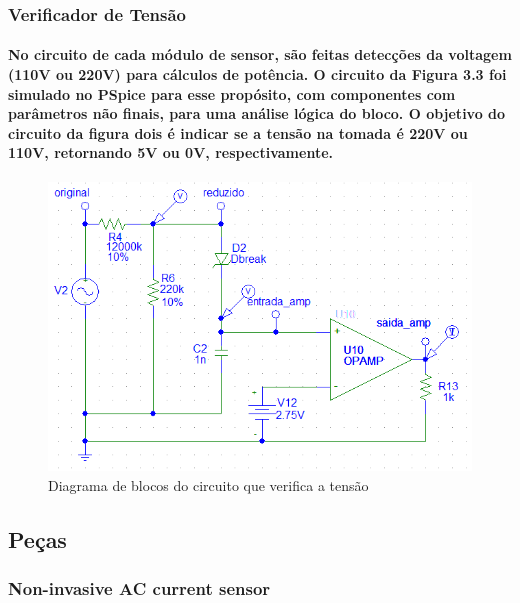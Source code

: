 \subsubsection{Verificador de Tensão}
\paragraph{
No circuito de cada módulo de sensor, são feitas detecções da voltagem (110V ou 220V) para cálculos de potência. O circuito da Figura 3.3 foi simulado no PSpice para esse propósito, com componentes com parâmetros não finais, para uma análise lógica do bloco. O objetivo do circuito da figura dois é indicar se a tensão na tomada é 220V ou 110V, retornando 5V ou 0V, respectivamente.
}
\begin{figure}[H]
\centering
\includegraphics[width=1\textwidth]{figuras/voltage-circuit.png}
\caption{\label{fig:voltage-circuit} Diagrama de blocos do circuito que verifica a tensão}
\end{figure}

\subsection{Peças}
\subsubsection{Non-invasive AC current sensor}
